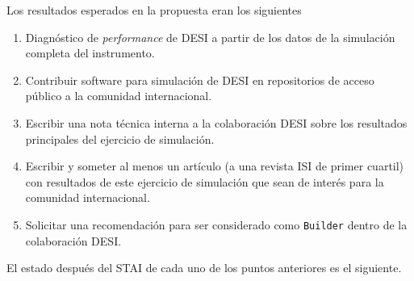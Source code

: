\documentclass[12pt,spanish]{article}
\begin{document}
Los resultados esperados en la propuesta eran los siguientes
\begin{enumerate}
\item Diagn\'ostico de \textit{performance} de DESI a partir de los
  datos de la simulaci\'on completa del instrumento.  
\item Contribuir software para simulaci\'on de DESI en repositorios de
  acceso p\'ublico a la comunidad internacional.
\item Escribir una nota t\'ecnica interna a la colaboraci\'on DESI
  sobre los resultados principales del ejercicio de simulaci\'on.
\item Escribir y someter al menos un art\'iculo (a una revista ISI
  de primer cuartil) con resultados de este ejercicio de
  simulaci\'on que sean de inter\'es para la comunidad internacional.  
\item Solicitar una recomendaci\'on para ser   considerado como
  \texttt{Builder}  dentro de la colaboraci\'on DESI.  
 \end{enumerate}

El estado despu\'es del STAI de cada uno de los puntos anteriores es
el siguiente.
\end{document}

